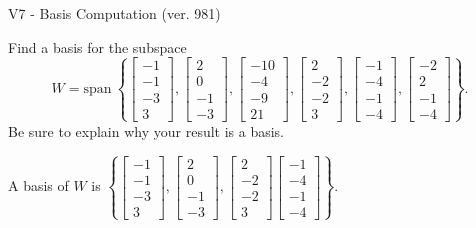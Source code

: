 \begin{exercise}
  \begin{exerciseTitle}V7 - Basis Computation (ver. 981)\end{exerciseTitle}
  \begin{exerciseStatement}
    Find a basis for the subspace 
\[W=\mathrm{span}\ \left\{\left[\begin{array}{r}
-1 \\
-1 \\
-3 \\
3
\end{array}\right] , \left[\begin{array}{r}
2 \\
0 \\
-1 \\
-3
\end{array}\right] , \left[\begin{array}{r}
-10 \\
-4 \\
-9 \\
21
\end{array}\right] , \left[\begin{array}{r}
2 \\
-2 \\
-2 \\
3
\end{array}\right] , \left[\begin{array}{r}
-1 \\
-4 \\
-1 \\
-4
\end{array}\right] , \left[\begin{array}{r}
-2 \\
2 \\
-1 \\
-4
\end{array}\right]\right\}.\]
 Be sure to explain why your result is a basis.


  \end{exerciseStatement}
  \begin{exerciseAnswer}
   A basis of \(W\) is  \(\left\{\left[\begin{array}{r}
-1 \\
-1 \\
-3 \\
3
\end{array}\right] , \left[\begin{array}{r}
2 \\
0 \\
-1 \\
-3
\end{array}\right] , \left[\begin{array}{r}
2 \\
-2 \\
-2 \\
3
\end{array}\right] \left[\begin{array}{r}
-1 \\
-4 \\
-1 \\
-4
\end{array}\right]\right\}\).
  


  \end{exerciseAnswer}
\end{exercise}